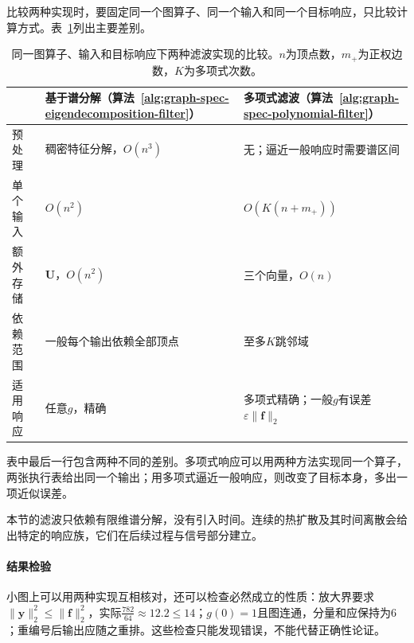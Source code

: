 比较两种实现时，要固定同一个图算子、同一个输入和同一个目标响应，只比较计算方式。表~\ref{tab:graph-spec-filter-comparison}列出主要差别。

\begin{table}[!htb]
  \centering\small
  \begin{tabularx}{\linewidth}{@{}lXX@{}}
    \toprule
    & 基于谱分解（算法~\ref{alg:graph-spec-eigendecomposition-filter}） & 多项式滤波（算法~\ref{alg:graph-spec-polynomial-filter}）\\
    \midrule
    预处理 & 稠密特征分解，$O(n^3)$ & 无；逼近一般响应时需要谱区间 \\
    单个输入 & $O(n^2)$ & $O(K(n+m_+))$ \\
    额外存储 & $\bm U$，$O(n^2)$ & 三个向量，$O(n)$ \\
    依赖范围 & 一般每个输出依赖全部顶点 & 至多$K$跳邻域 \\
    适用响应 & 任意$g$，精确 & 多项式精确；一般$g$有误差$\varepsilon\lVert\bm f\rVert_2$ \\
    \bottomrule
  \end{tabularx}
  \caption{同一图算子、输入和目标响应下两种滤波实现的比较。$n$为顶点数，$m_+$为正权边数，$K$为多项式次数。}
  \label{tab:graph-spec-filter-comparison}
\end{table}

表中最后一行包含两种不同的差别。多项式响应可以用两种方法实现同一个算子，两张执行表给出同一个输出；用多项式逼近一般响应，则改变了目标本身，多出一项近似误差。

本节的滤波只依赖有限维谱分解，没有引入时间。连续的热扩散及其时间离散会给出特定的响应族，它们在后续过程与信号部分建立。

\paragraph{结果检验}
小图上可以用两种实现互相核对，还可以检查必然成立的性质：放大界要求$\lVert\bm y\rVert_2^2\leq\lVert\bm f\rVert_2^2$，实际$\tfrac{782}{64}\approx12.2\leq14$；$g(0)=1$且图连通，分量和应保持为$6$；重编号后输出应随之重排。这些检查只能发现错误，不能代替正确性论证。
